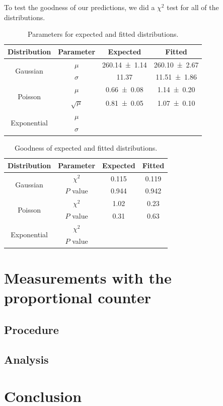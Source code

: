 To test the goodness of our predictions, we did a $\chi^2$ test for all of the distributions.   

\begin{table}[H]
	\renewcommand{\arraystretch}{1.5}
	\centering
	\begin{tabular}{|c|c|c|c|}
		\hline
		Distribution & Parameter & Expected & Fitted \\
		\hline
		\multirow{2}{*}{Gaussian} & $\mu$ & \SI{260.14 \pm 1.14}{} & \SI{260.10 \pm 2.67}{} \\
		 & $\sigma$ & \SI{11.37}{} & \SI{11.51 \pm 1.86}{} \\
		\hline
		\multirow{2}{*}{Poisson} & $\mu$ & \SI{0.66 \pm 0.08}{} & \SI{1.14 \pm 0.20}{} \\
		 & $\sqrt{\mu}$ & \SI{0.81 \pm 0,05}{} & \SI{1,07 \pm 0,10}{} \\
		\hline
		\multirow{2}{*}{Exponential} & $\mu$ & \SI{}{} & \SI{}{} \\
		 & $\sigma$ & \SI{}{} & \SI{}{} \\
		\hline
	\end{tabular}
	\caption{Parameters for expected and fitted distributions.}
	\label{tab:DistPara}
\end{table}

\begin{table}[H]
	\renewcommand{\arraystretch}{1.5}
	\centering
	\begin{tabular}{|c|c|c|c|}
		\hline
		Distribution & Parameter & Expected & Fitted \\
		\hline
		\multirow{2}{*}{Gaussian} & $\chi^2$ & \SI{0.115}{} & \SI{0.119}{} \\
		 & $P$ value & \SI{0.944}{} & \SI{0.942}{} \\
		\hline
		\multirow{2}{*}{Poisson} & $\chi^2$ & \SI{1.02}{} & \SI{0.23}{} \\
		 & $P$ value & \SI{0.31}{} & \SI{0.63}{} \\
		\hline
		\multirow{2}{*}{Exponential} & $\chi^2$ & \SI{}{} & \SI{}{} \\
		 & $P$ value & \SI{}{} & \SI{}{} \\
		\hline
	\end{tabular}
	\caption{Goodness of expected and fitted distributions.}
	\label{tab:DistGood}
\end{table}

\section{Measurements with the proportional counter}

\subsection{Procedure}

\subsection{Analysis}

\section{Conclusion}




